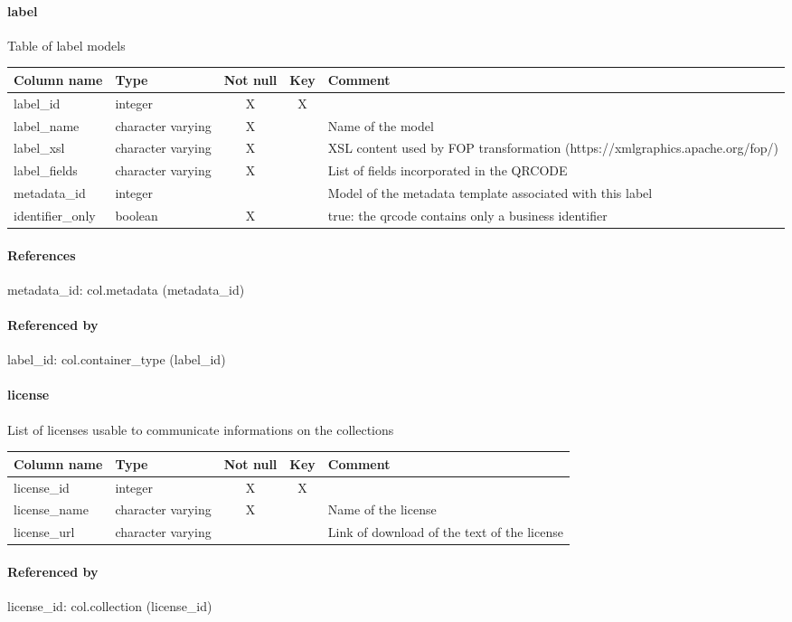 \paragraph{label}
Table of label models

\begin{tabular}{|l| p{2cm}|c|c| p{5cm}|}
\hline
Column name & Type & Not null & Key & Comment \\
\hline
label\_id & integer & X & X & \\
label\_name & character varying & X &  & Name of the model\\
label\_xsl & character varying & X &  & XSL content used by FOP transformation (https://xmlgraphics.apache.org/fop/)\\
label\_fields & character varying & X &  & List of fields incorporated in the QRCODE\\
metadata\_id & integer &  &  & Model of the metadata template associated with this label\\
identifier\_only & boolean & X &  & true: the qrcode contains only a business identifier\\
\hline
\end{tabular}
\paragraph{References}
metadata\_id: col.metadata (metadata\_id)

\paragraph{Referenced by}
label\_id: col.container\_type (label\_id)

\paragraph{license}
List of licenses usable to communicate informations on the collections

\begin{tabular}{|l| p{2cm}|c|c| p{5cm}|}
\hline
Column name & Type & Not null & Key & Comment \\
\hline
license\_id & integer & X & X & \\
license\_name & character varying & X &  & Name of the license\\
license\_url & character varying &  &  & Link of download of the text of the license\\
\hline
\end{tabular}
\paragraph{Referenced by}
license\_id: col.collection (license\_id)

